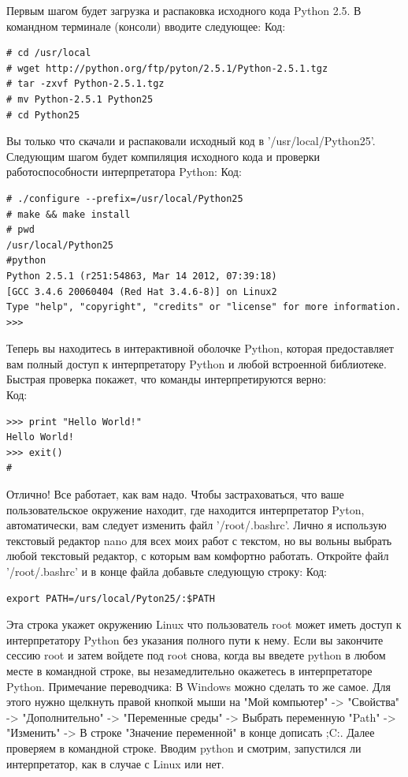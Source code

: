 \documentclass[12pt, a4paper, oneside]{book}
\begin{document}
Первым шагом будет загрузка и распаковка исходного кода Python 2.5. В командном терминале (консоли) вводите следующее:
Код:
\begin{verbatim}
# cd /usr/local
# wget http://python.org/ftp/pyton/2.5.1/Python-2.5.1.tgz
# tar -zxvf Python-2.5.1.tgz
# mv Python-2.5.1 Python25
# cd Python25
\end{verbatim}
Вы только что скачали и распаковали исходный код в '/usr/local/Python25'. Следующим шагом будет компиляция исходного кода и проверки работоспособности интерпретатора Python:
Код:
\begin{verbatim}
# ./configure --prefix=/usr/local/Python25
# make && make install
# pwd
/usr/local/Python25
#python
Python 2.5.1 (r251:54863, Mar 14 2012, 07:39:18)
[GCC 3.4.6 20060404 (Red Hat 3.4.6-8)] on Linux2
Type "help", "copyright", "credits" or "license" for more information.
>>>
\end{verbatim}
Теперь вы находитесь в интерактивной оболочке Python, которая предоставляет вам полный доступ к интерпретатору Python и любой встроенной библиотеке. Быстрая проверка покажет, что команды интерпретируются верно:\\
Код:
\begin{verbatim}
>>> print "Hello World!"
Hello World!
>>> exit()
#
\end{verbatim}
Отлично! Все работает, как вам надо. Чтобы застраховаться, что ваше пользовательское окружение находит, где находится интерпретатор Pyton, автоматически, вам следует изменить файл '/root/.bashrc'. Лично я использую текстовый редактор nano для всех моих работ с текстом, но вы вольны выбрать любой текстовый редактор, с которым вам комфортно работать. Откройте файл '/root/.bashrc' и в конце файла добавьте следующую строку:
Код:
\begin{verbatim}
export PATH=/urs/local/Pyton25/:$PATH
\end{verbatim}
Эта строка укажет окружению Linux что пользователь root может иметь доступ к интерпретатору Python без указания полного пути к нему. Если вы закончите сессию root и затем войдете под root снова, когда вы введете python в любом месте в командной строке, вы незамедлительно окажетесь в интерпретаторе Python.
Примечание переводчика: В Windows можно сделать то же самое. Для этого нужно щелкнуть правой кнопкой мыши на "Мой компьютер" -> "Свойства" -> "Дополнительно" -> "Переменные среды" -> Выбрать переменную "Path" -> "Изменить" -> В строке "Значение переменной" в конце дописать ;C:. Далее проверяем в командной строке. Вводим python и смотрим, запустился ли интерпретатор, как в случае с Linux или нет.\\
\end{document}
